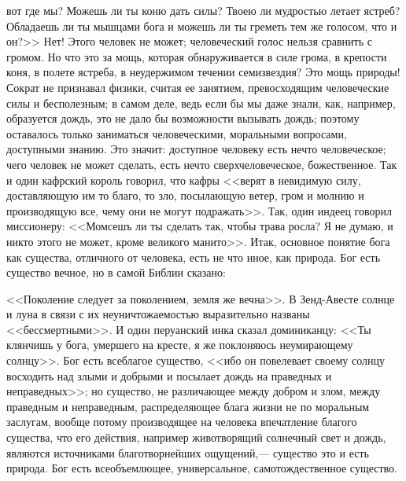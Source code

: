 \documentclass[12pt]{article}
\begin{document}
вот где мы? Можешь ли ты коню дать силы? Твоею ли мудростью летает ястреб? Обладаешь ли ты мышцами бога и можешь ли ты греметь тем же голосом, что и он?>> Нет! Этого человек не может; человеческий голос нельзя сравнить с громом. Но что это за мощь, которая обнаруживается в силе грома, в крепости коня, в полете ястреба, в неудержимом течении семизвездия? Это мощь природы! Сократ не признавал физики, считая ее занятием, превосходящим человеческие силы и бесполезным; в самом деле, ведь если бы мы даже знали, как, например, образуется дождь, это не дало бы возможности вызывать дождь; поэтому оставалось только заниматься человеческими, моральными вопросами, доступными знанию. Это значит: доступное человеку есть нечто человеческое; чего человек не может сделать, есть нечто сверхчеловеческое, божественное. Так и один кафрский король говорил, что кафры <<верят в невидимую силу, доставляющую им то благо, то зло, посылающую ветер, гром и молнию и производящую все, чему они не могут подражать>>. Так, один индеец говорил миссионеру: <<Момсешъ ли ты сделать так, чтобы трава росла? Я не думаю, и никто этого не может, кроме великого манито>>. Итак, основное понятие бога как существа, отличного от человека, есть не что иное, как природа. Бог есть существо вечное, но в самой Библии сказано:

<<Поколение следует за поколением, земля же вечна>>. В Зенд-Авесте солнце и луна в связи с их неуничтожаемостью выразительно названы <<бессмертными>>. И один перуанский инка сказал доминиканцу: <<Ты клянчишь у бога, умершего на кресте, я же поклоняюсь неумирающему солнцу>>. Бог есть всеблагое существо, <<ибо он повелевает своему солнцу восходить над злыми и добрыми и посылает дождь на праведных и неправедных>>; но существо, не различающее между добром и злом, между праведным и неправедным, распределяющее блага жизни не по моральным заслугам, вообще потому производящее на человека впечатление благого существа, что его действия, например животворящий солнечный свет и дождь, являются источниками благотворнейших ощущений,--- существо это и есть природа. Бог есть всеобъемлющее, универсальное, самотождественное существо.
\end{document}
